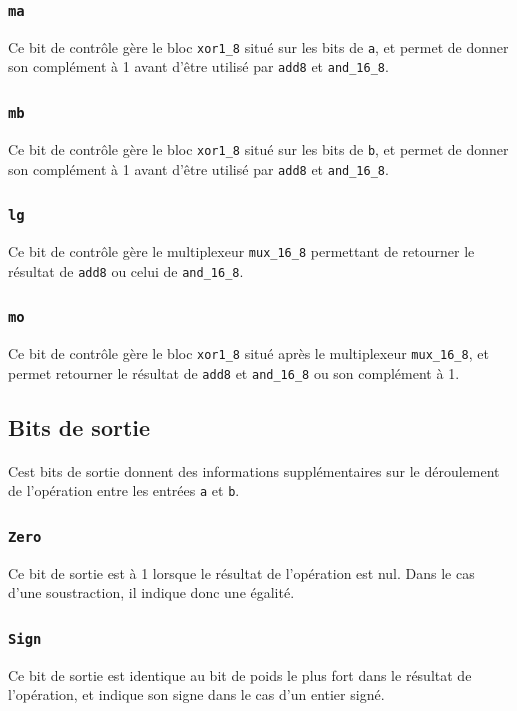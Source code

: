\documentclass[11pt, a4paper, twoside, titlepage]{article}
\begin{document}
\subsubsection{\texttt{ma}}
Ce bit de contrôle gère le bloc \texttt{xor1\_8} situé sur les bits de \texttt{a}, et permet de donner son complément à 1 avant d'être utilisé par \texttt{add8} et \texttt{and\_16\_8}.

\subsubsection{\texttt{mb}}
Ce bit de contrôle gère le bloc \texttt{xor1\_8} situé sur les bits de \texttt{b}, et permet de donner son complément à 1 avant d'être utilisé par \texttt{add8} et \texttt{and\_16\_8}.

\subsubsection{\texttt{lg}}
Ce bit de contrôle gère le multiplexeur \texttt{mux\_16\_8} permettant de retourner le résultat de \texttt{add8} ou celui de \texttt{and\_16\_8}.

\subsubsection{\texttt{mo}}
Ce bit de contrôle gère le bloc \texttt{xor1\_8} situé après le multiplexeur \texttt{mux\_16\_8}, et permet retourner le résultat de \texttt{add8} et \texttt{and\_16\_8} ou son complément à 1.

\subsection{Bits de sortie}
\paragraph{}
Cest bits de sortie donnent des informations supplémentaires sur le déroulement de l'opération entre les entrées \texttt{a} et \texttt{b}.

\subsubsection{\texttt{Zero}}
Ce bit de sortie est à 1 lorsque le résultat de l'opération est nul. Dans le cas d'une soustraction, il indique donc une égalité.

\subsubsection{\texttt{Sign}}
Ce bit de sortie est identique au bit de poids le plus fort dans le résultat de l'opération, et indique son signe dans le cas d'un entier signé.
\end{document}
